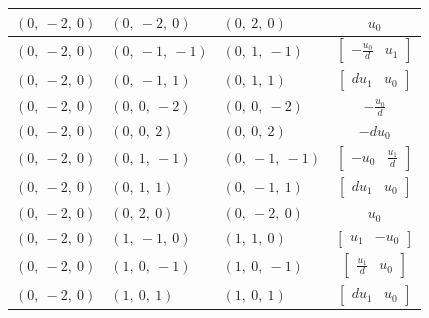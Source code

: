\documentclass[11pt]{article}
\theoremstyle{definition}
\begin{document}
\begin{longtable}{|l|l|l|c|}
    \hline
    $\left( 0, \  -2, \  0\right)$ & $\left( 0, \  -2, \  0\right)$ & $\left( 0, \  2, \  0\right)$ & $u_{0}$ \\
    \hline
    $\left( 0, \  -2, \  0\right)$ & $\left( 0, \  -1, \  -1\right)$ & $\left( 0, \  1, \  -1\right)$ & $\left[\begin{matrix}- \frac{u_{0}}{d} & u_{1}\end{matrix}\right]$ \\
    \hline
    $\left( 0, \  -2, \  0\right)$ & $\left( 0, \  -1, \  1\right)$ & $\left( 0, \  1, \  1\right)$ & $\left[\begin{matrix}d u_{1} & u_{0}\end{matrix}\right]$ \\
    \hline
    $\left( 0, \  -2, \  0\right)$ & $\left( 0, \  0, \  -2\right)$ & $\left( 0, \  0, \  -2\right)$ & $- \frac{u_{0}}{d}$ \\
    \hline
    $\left( 0, \  -2, \  0\right)$ & $\left( 0, \  0, \  2\right)$ & $\left( 0, \  0, \  2\right)$ & $- d u_{0}$ \\
    \hline
    $\left( 0, \  -2, \  0\right)$ & $\left( 0, \  1, \  -1\right)$ & $\left( 0, \  -1, \  -1\right)$ & $\left[\begin{matrix}- u_{0} & \frac{u_{1}}{d}\end{matrix}\right]$ \\
    \hline
    $\left( 0, \  -2, \  0\right)$ & $\left( 0, \  1, \  1\right)$ & $\left( 0, \  -1, \  1\right)$ & $\left[\begin{matrix}d u_{1} & u_{0}\end{matrix}\right]$ \\
    \hline
    $\left( 0, \  -2, \  0\right)$ & $\left( 0, \  2, \  0\right)$ & $\left( 0, \  -2, \  0\right)$ & $u_{0}$ \\
    \hline
    $\left( 0, \  -2, \  0\right)$ & $\left( 1, \  -1, \  0\right)$ & $\left( 1, \  1, \  0\right)$ & $\left[\begin{matrix}u_{1} & - u_{0}\end{matrix}\right]$ \\
    \hline
    $\left( 0, \  -2, \  0\right)$ & $\left( 1, \  0, \  -1\right)$ & $\left( 1, \  0, \  -1\right)$ & $\left[\begin{matrix}\frac{u_{1}}{d} & u_{0}\end{matrix}\right]$ \\
    \hline
    $\left( 0, \  -2, \  0\right)$ & $\left( 1, \  0, \  1\right)$ & $\left( 1, \  0, \  1\right)$ & $\left[\begin{matrix}d u_{1} & u_{0}\end{matrix}\right]$ \\

\end{longtable}
\end{document}
